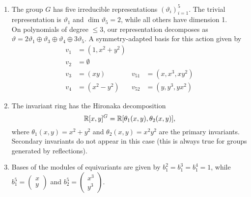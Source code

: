 \documentclass[]{article}
\begin{document}
\begin{enumerate}
    \item The group $G$ has five irreducible representations $(\vartheta_i)_{i=1}^5$. The trivial representation is $\vartheta_1$ and $\dim \vartheta_5=2$, while all others have dimension 1.\\
    On polynomials of degree $\leq3$, our representation decomposes as $\vartheta=2\vartheta_1\oplus\vartheta_3\oplus\vartheta_4\oplus3\vartheta_5$. A symmetry-adapted basis for this action given by   
    \begin{align*}
        v_1&=(1,x^2+y^2)&&\\
        v_2&=\emptyset&&\\
        v_3&=(xy) &   v_{51}&=(x,x^3,xy^2) \\
        v_4&=(x^2-y^2) &     v_{52}&=(y,y^3,yx^2)
    \end{align*}
    
    \item The invariant ring has the Hironaka decomposition
    \[
        \mathbb R[x,y]^G=\mathbb R[\theta_1(x,y),\theta_2(x,y)],
    \]
    where $\theta_1(x,y)=x^2+y^2$ and $\theta_2(x,y)=x^2y^2$ are the primary invariants. Secondary invariants do not appear in this case (this is always true for groups generated by reflections).\\ %
    
    \item Bases of the modules of equivariants are given by $b_1^2=b_1^3=b_1^4=1$, while $b_1^5=\begin{pmatrix}x\\y\end{pmatrix}$ and $b_2^5=\begin{pmatrix}x^3\\y^3\end{pmatrix}$.
    

\end{enumerate}
\end{document}
